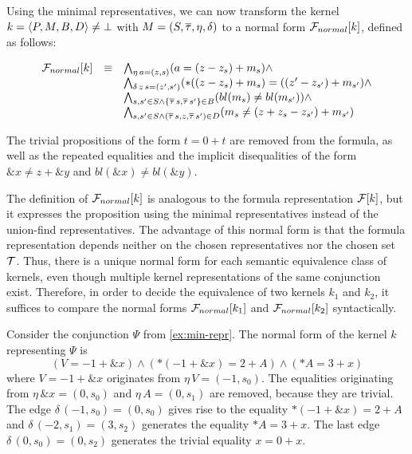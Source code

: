 Using the minimal representatives, we can now transform the kernel $k = \langle P,M,B,D\rangle \neq \bot$ with $M = (S, \overline{\tau}, \eta, \delta)$ to a normal form $\mathcal{F}_{normal}[k]$,
defined as follows:

\[
    \begin{array}{lll}
        \mathcal{F}_{normal}[k] & \equiv & \bigwedge_{\eta\,a=(z,s)} (a = (z - z_s) + m_s) \land                                               \\
                       &        & \bigwedge_{\delta\,z\,s=(z',s')} (*((z-z_s) + m_s) = ((z'-z_{s'}) + m_{s'}) \land                   \\
                       &        & \bigwedge_{s,s' \in S \land \{\overline{\tau}\,s,\overline{\tau}\,s'\}\in B} (bl(m_{s}) \neq bl(m_{s'})) \land          \\
                       &        & \bigwedge_{s,s' \in S \land (\overline{\tau}\,s, z,\overline{\tau}\,s') \in D} (m_{s} \neq (z+ z_{s} -z_{s'}) + m_{s'})
    \end{array}
\]

The trivial propositions of the form $t = 0 + t$ are removed from the formula, as well as the repeated equalities and the implicit disequalities of the form $\&x \neq z + \&y$ and $bl(\&x) \neq bl(\&y)$.

The definition of $\mathcal{F}_{normal}[k]$ is analogous to the formula representation $\mathcal{F}[k]$, but it expresses the proposition using the minimal representatives instead of the union-find representatives.
The advantage of this normal form is that the formula representation depends neither on the chosen representatives nor the chosen set $\mathcal{T}$.
Thus, there is a unique normal form for each semantic equivalence class of kernels, even though multiple kernel representations of the same conjunction exist.
Therefore, in order to decide the equivalence of two kernels $k_1$ and $k_2$, it suffices to compare the normal forms $\mathcal{F}_{normal}[k_1]$ and $\mathcal{F}_{normal}[k_2]$ syntactically.

\begin{example}
    Consider the conjunction $\Psi$ from \cref{ex:min-repr}.
    The normal form of the kernel $k$ representing $\Psi$ is
    \[
        (V = -1+\&x) \land (*(-1 + \&x) = 2 + A) \land (*A = 3 + x)
    \]
    where $V = -1 + \&x$ originates from $\eta\,V = (-1,s_0)$.
    The equalities originating from $\eta\,\&x = (0,s_0)$ and $\eta\,A = (0, s_1)$ are removed, because they are trivial.
    The edge $\delta\,(-1,s_0) = (0,s_0)$ gives rise to the equality $*(-1 + \&x) = 2 + A$ and $\delta\,(-2,s_1) = (3,s_2)$ generates the equality $*A = 3 + x$.
    The last edge $\delta\,(0,s_0) = (0,s_2)$ generates the trivial equality $x = 0 + x$.
\end{example}


